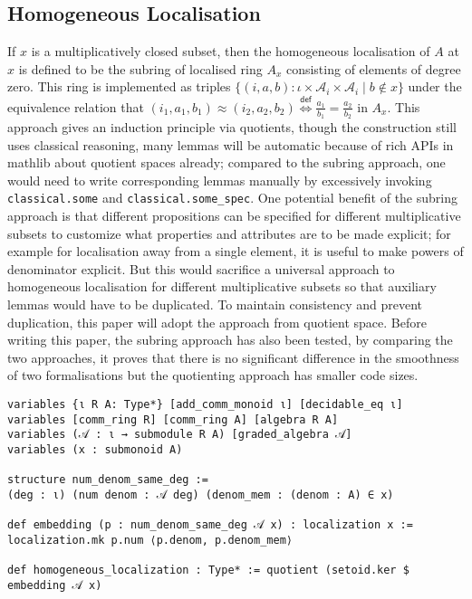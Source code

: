 \documentclass[a4paper,UKenglish,cleveref, autoref, thm-restate]{lipics-v2021}
\begin{document}
\subsection{Homogeneous Localisation}
If $x$ is a multiplicatively closed subset, then the homogeneous localisation of $A$ at $x$ is defined to be the subring of localised ring $A_x$ consisting of elements of degree zero. This ring is implemented as triples $\{(i, a, b) : \iota\times \mathcal{A}_i\times \mathcal{A}_i\mid b\not\in x\}$ under the equivalence relation that $(i_1, a_1, b_1)\approx(i_2, a_2, b_2)\stackrel{\mathsf{def}}{\iff}\frac {a_1}{b_1} = \frac{a_2}{b_2}$ in $A_x$. This approach gives an induction principle via quotients, though the construction still uses classical reasoning, many lemmas will be automatic because of rich APIs in \textsf{mathlib} about quotient spaces already; compared to the subring approach, one would need to write corresponding lemmas manually by excessively invoking \lstinline{classical.some} and \lstinline{classical.some_spec}. One potential benefit of the subring approach is that different propositions can be specified for different multiplicative subsets to customize what properties and attributes are to be made explicit; for example for localisation away from a single element, it is useful to make powers of denominator explicit. But this would sacrifice a universal approach to homogeneous localisation for different multiplicative subsets so that auxiliary lemmas would have to be duplicated. To maintain consistency and prevent duplication, this paper will adopt the approach from quotient space. Before writing this paper, the subring approach has also been tested, by comparing the two approaches, it proves that there is no significant difference in the smoothness of two formalisations but the quotienting approach has smaller code sizes. 

\begin{lstlisting}
variables {ι R A: Type*} [add_comm_monoid ι] [decidable_eq ι]
variables [comm_ring R] [comm_ring A] [algebra R A]
variables (𝒜 : ι → submodule R A) [graded_algebra 𝒜]
variables (x : submonoid A)

structure num_denom_same_deg :=
(deg : ι) (num denom : 𝒜 deg) (denom_mem : (denom : A) ∈ x)

def embedding (p : num_denom_same_deg 𝒜 x) : localization x :=
localization.mk p.num ⟨p.denom, p.denom_mem⟩

def homogeneous_localization : Type* := quotient (setoid.ker $ embedding 𝒜 x)
\end{lstlisting}
\end{document}
